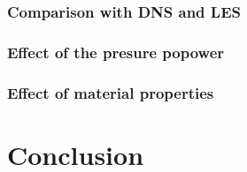 \documentclass[12pt,oneside]{jbook}
\begin{document}
\subsection{Comparison with DNS and LES}
\subsection{Effect of the presure popower}
\subsection{Effect of material properties}
\subsection{}
\chapter{Conclusion}


\appendix




\end{document}

